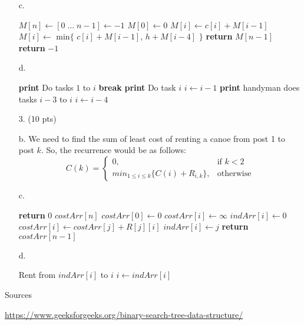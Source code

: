 \documentclass[11pt]{article}
\begin{document}
\begin{itemize}
	\item[c.]
\begin{algorithmic}[1]
		\State $M[n] \gets [ 0 \phantom{|}...\phantom{|} n - 1] \gets -1$ 
			\State $M[0] \gets 0$
				\State $M[i] \gets c[i] + M[i-1]$
			\EndFor			
		\Else
				\State $M[i] \gets$ min$\{$ $c[i] + M[i-1]$, $h + M[i-4]$ $\}$
			\EndFor
		\EndIf
		\State \textbf{return} $M[n-1]$
	\Else 	
		\State \textbf{return} $-1$
	\EndIf
\EndFunction
\end{algorithmic}
	\item[d.]
	
\begin{algorithmic}[1]
			\State \textbf{print} Do tasks $1$ to $i$
			\State \textbf{break}
			\State \textbf{print} Do task $i$
			\State $i \gets i - 1$
		\Else	
			\State \textbf{print} handyman does tasks $i - 3$ to $i$
			\State $i \gets i - 4$
		\EndIf
	\EndFor
\EndFunction
\end{algorithmic}
	
	
\item[$3.$] (10 pts)

	\item[b.]
	We need to find the sum of least cost of renting a canoe from post 1 to post $k$. So, the recurrence would be as follows:
	$$\boxed{{\displaystyle C(k)={
\begin{cases}{0},&{\text{if }} k < 2\\ min_{1 \leq i \leq k}\{ C(i) + R_{i,k} \},&{\text{otherwise}}
\end{cases}}}}$$
	
	\item[c.]
	\begin{algorithmic}[1]
 
		\State \textbf{return}  0
	\EndIf
	\State $costArr[n]$
	\State $costArr[0] \gets 0$
		\State $costArr[i] \gets \infty$ 
		\State $indArr[i] \gets 0$
				\State $costArr[i] \gets costArr[j] + R[j][i]$
				\State $indArr[i] \gets j$
			\EndIf
		\EndFor
	\EndFor
	\State \textbf{return} $costArr[n-1]$
\EndFunction
\end{algorithmic}
	
	\item[d.]
	\begin{algorithmic}[1]
		\State Rent from $indArr[i]$ to $i$ 
		\State $i \gets indArr[i]$
	\EndFor
\EndFunction
\end{algorithmic}
	
\end{itemize}
\begin{center}
Sources
\end{center}

\url{https://www.geeksforgeeks.org/binary-search-tree-data-structure/}
\end{document}
